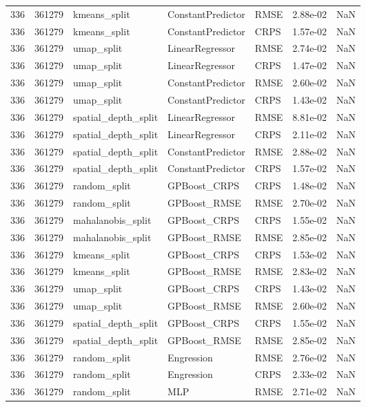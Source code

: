 \begin{tabular}{rrlllrr}
336 & 361279 & kmeans\_split & ConstantPredictor & RMSE & 2.88e-02 & NaN \\
336 & 361279 & kmeans\_split & ConstantPredictor & CRPS & 1.57e-02 & NaN \\
336 & 361279 & umap\_split & LinearRegressor & RMSE & 2.74e-02 & NaN \\
336 & 361279 & umap\_split & LinearRegressor & CRPS & 1.47e-02 & NaN \\
336 & 361279 & umap\_split & ConstantPredictor & RMSE & 2.60e-02 & NaN \\
336 & 361279 & umap\_split & ConstantPredictor & CRPS & 1.43e-02 & NaN \\
336 & 361279 & spatial\_depth\_split & LinearRegressor & RMSE & 8.81e-02 & NaN \\
336 & 361279 & spatial\_depth\_split & LinearRegressor & CRPS & 2.11e-02 & NaN \\
336 & 361279 & spatial\_depth\_split & ConstantPredictor & RMSE & 2.88e-02 & NaN \\
336 & 361279 & spatial\_depth\_split & ConstantPredictor & CRPS & 1.57e-02 & NaN \\
336 & 361279 & random\_split & GPBoost\_CRPS & CRPS & 1.48e-02 & NaN \\
336 & 361279 & random\_split & GPBoost\_RMSE & RMSE & 2.70e-02 & NaN \\
336 & 361279 & mahalanobis\_split & GPBoost\_CRPS & CRPS & 1.55e-02 & NaN \\
336 & 361279 & mahalanobis\_split & GPBoost\_RMSE & RMSE & 2.85e-02 & NaN \\
336 & 361279 & kmeans\_split & GPBoost\_CRPS & CRPS & 1.53e-02 & NaN \\
336 & 361279 & kmeans\_split & GPBoost\_RMSE & RMSE & 2.83e-02 & NaN \\
336 & 361279 & umap\_split & GPBoost\_CRPS & CRPS & 1.43e-02 & NaN \\
336 & 361279 & umap\_split & GPBoost\_RMSE & RMSE & 2.60e-02 & NaN \\
336 & 361279 & spatial\_depth\_split & GPBoost\_CRPS & CRPS & 1.55e-02 & NaN \\
336 & 361279 & spatial\_depth\_split & GPBoost\_RMSE & RMSE & 2.85e-02 & NaN \\
336 & 361279 & random\_split & Engression & RMSE & 2.76e-02 & NaN \\
336 & 361279 & random\_split & Engression & CRPS & 2.33e-02 & NaN \\
336 & 361279 & random\_split & MLP & RMSE & 2.71e-02 & NaN \\

\end{tabular}
